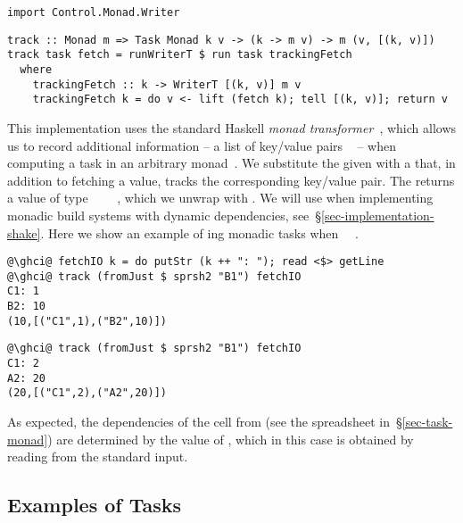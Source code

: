 \vspace{1mm}
\begin{verbatim}
import Control.Monad.Writer
\end{verbatim}
\vspace{0.5mm}
\begin{verbatim}
track :: Monad m => Task Monad k v -> (k -> m v) -> m (v, [(k, v)])
track task fetch = runWriterT $ run task trackingFetch
  where
    trackingFetch :: k -> WriterT [(k, v)] m v
    trackingFetch k = do v <- lift (fetch k); tell [(k, v)]; return v
\end{verbatim}
\vspace{1mm}

\noindent
This implementation uses the standard Haskell  \emph{monad
transformer}~\cite{liang1995monad}, which allows us to record additional
information -- a list of key/value pairs \hs{[(@@k,}~\hs{v)]} -- when computing
a task in an arbitrary monad~. We substitute the given  with a
 that, in addition to fetching a value, tracks the
corresponding key/value pair. The  returns a value of type
~\hs{[(@@k,}~\hs{v)]}~~, which we unwrap with
. We will use  when implementing monadic build systems
with dynamic dependencies, see~\S\ref{sec-implementation-shake}. Here we show an
example of ing monadic tasks when ~\hs{=}~.

\vspace{1mm}
\begin{verbatim}
@\ghci@ fetchIO k = do putStr (k ++ ": "); read <$> getLine
@\ghci@ track (fromJust $ sprsh2 "B1") fetchIO
C1: 1
B2: 10
(10,[("C1",1),("B2",10)])
\end{verbatim}
\vspace{1mm}
\begin{verbatim}
@\ghci@ track (fromJust $ sprsh2 "B1") fetchIO
C1: 2
A2: 20
(20,[("C1",2),("A2",20)])
\end{verbatim}
\vspace{1mm}

\noindent
As expected, the dependencies of the cell  from  (see the
spreadsheet in~\S\ref{sec-task-monad}) are determined by the value of ,
which in this case is obtained by reading from the standard input.

\subsection{Examples of Tasks}\label{sec-task-examples}

